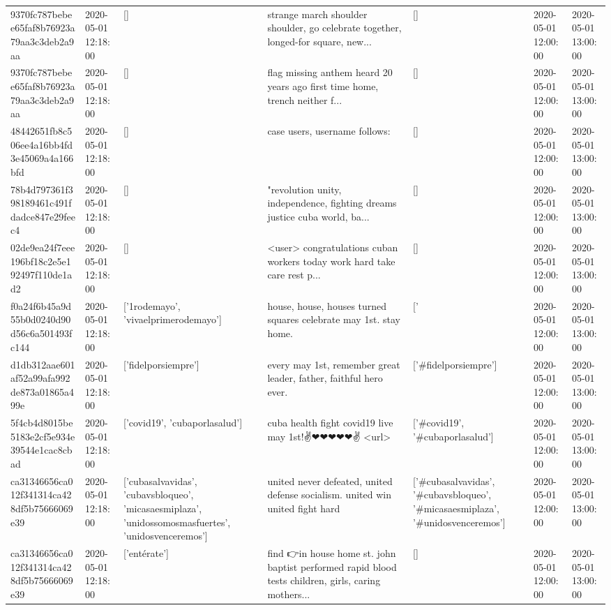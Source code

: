 \begin{tabular}{lllllll}
9370fc787bebee65faf8b76923a79aa3c3deb2a9aa & 2020-05-01 12:18:00 & [] & strange march shoulder shoulder, go celebrate together, longed-for square, new... & [] & 2020-05-01 12:00:00 & 2020-05-01 13:00:00 \\
9370fc787bebee65faf8b76923a79aa3c3deb2a9aa & 2020-05-01 12:18:00 & [] & flag missing anthem heard 20 years ago first time home, trench neither f... & [] & 2020-05-01 12:00:00 & 2020-05-01 13:00:00 \\
48442651fb8c506ee4a16bb4fd3e45069a4a166bfd & 2020-05-01 12:18:00 & [] & case users, username follows: & [] & 2020-05-01 12:00:00 & 2020-05-01 13:00:00 \\
78b4d797361f398189461c491fdadce847e29feec4 & 2020-05-01 12:18:00 & [] & "revolution unity, independence, fighting dreams justice cuba world, ba... & [] & 2020-05-01 12:00:00 & 2020-05-01 13:00:00 \\
02de9ea24f7eee196bf18c2e5e192497f110de1ad2 & 2020-05-01 12:18:00 & [] & <user> congratulations cuban workers today work hard take care rest p... & [] & 2020-05-01 12:00:00 & 2020-05-01 13:00:00 \\
f0a24f6b45a9d55b0d0240d90d56c6a501493fc144 & 2020-05-01 12:18:00 & ['1rodemayo', 'vivaelprimerodemayo'] & house, house, houses turned squares celebrate may 1st. stay home. & ['#1rodemayo', '#vivaelprimerodemayo'] & 2020-05-01 12:00:00 & 2020-05-01 13:00:00 \\
d1db312aae601af52a99afa992de873a01865a499e & 2020-05-01 12:18:00 & ['fidelporsiempre'] & every may 1st, remember great leader, father, faithful hero ever. & ['#fidelporsiempre'] & 2020-05-01 12:00:00 & 2020-05-01 13:00:00 \\
5f4cb4d8015be5183e2cf5e934e39544e1cac8cbad & 2020-05-01 12:18:00 & ['covid19', 'cubaporlasalud'] & cuba health fight covid19 live may 1st!✌❤❤❤❤❤✌ <url> & ['#covid19', '#cubaporlasalud'] & 2020-05-01 12:00:00 & 2020-05-01 13:00:00 \\
ca31346656ca012f341314ca428df5b75666069e39 & 2020-05-01 12:18:00 & ['cubasalvavidas', 'cubavsbloqueo', 'micasaesmiplaza', 'unidossomosmasfuertes', 'unidosvenceremos'] & united never defeated, united defense socialism. united win united fight hard & ['#cubasalvavidas', '#cubavsbloqueo', '#micasaesmiplaza', '#unidosvenceremos'] & 2020-05-01 12:00:00 & 2020-05-01 13:00:00 \\
ca31346656ca012f341314ca428df5b75666069e39 & 2020-05-01 12:18:00 & ['entérate'] & find 👉in house home st. john baptist performed rapid blood tests children, girls, caring mothers... & [] & 2020-05-01 12:00:00 & 2020-05-01 13:00:00 \\

\end{tabular}
